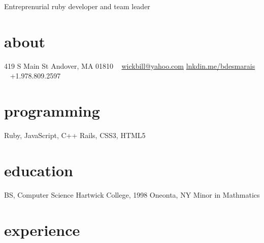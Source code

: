 \documentclass[]{friggeri-cv}
\begin{document}
       {Entreprenurial ruby developer and team leader}
       
\begin{aside}
  \section{about}
    419 S Main St
    Andover, MA 01810
    ~
    \href{mailto:wickbill@yahoo.com}{wickbill@yahoo.com}
    \href{http:/lnkdin.me/bdesmarais}{lnkdin.me/bdesmarais}
    ~
    +1.978.809.2597
  \section{programming}
    Ruby, JavaScript, C++
    Rails, CSS3, HTML5
  \section{education}
    BS, Computer Science
    Hartwick College, 1998
    Oneonta, NY
    Minor in Mathmatics
\end{aside}

\section{experience}
\end{document}
